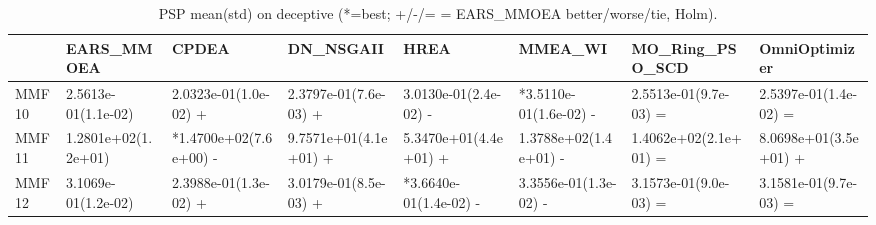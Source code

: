 \begin{table}[t]
\centering
\caption{PSP mean(std) on deceptive (*=best; +/-/= = EARS_MMOEA better/worse/tie, Holm).}
\label{tab:deceptive_PSP}
\begin{tabular}{llllllll}
\toprule
 & EARS\_MMOEA & CPDEA & DN\_NSGAII & HREA & MMEA\_WI & MO\_Ring\_PSO\_SCD & OmniOptimizer \\
\midrule
MMF10 & 2.5613e-01(1.1e-02) & 2.0323e-01(1.0e-02) + & 2.3797e-01(7.6e-03) + & 3.0130e-01(2.4e-02) - & *3.5110e-01(1.6e-02) - & 2.5513e-01(9.7e-03) = & 2.5397e-01(1.4e-02) = \\
MMF11 & 1.2801e+02(1.2e+01) & *1.4700e+02(7.6e+00) - & 9.7571e+01(4.1e+01) + & 5.3470e+01(4.4e+01) + & 1.3788e+02(1.4e+01) - & 1.4062e+02(2.1e+01) = & 8.0698e+01(3.5e+01) + \\
MMF12 & 3.1069e-01(1.2e-02) & 2.3988e-01(1.3e-02) + & 3.0179e-01(8.5e-03) + & *3.6640e-01(1.4e-02) - & 3.3556e-01(1.3e-02) - & 3.1573e-01(9.0e-03) = & 3.1581e-01(9.7e-03) = \\
\bottomrule
\end{tabular}
\end{table}
